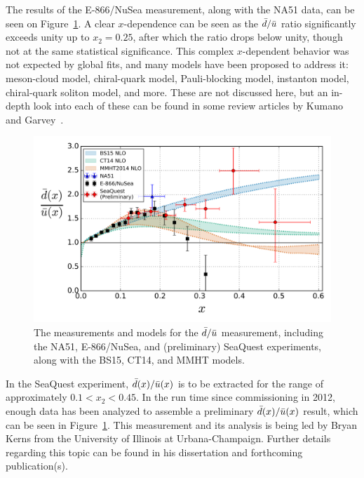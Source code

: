 The results of the E-866/NuSea measurement\cite{PhysRevLett.80.3715}, along with the NA51 data, can be seen on Figure~\ref{fig:dbar-ubar}. A clear $x$-dependence can be seen as the $\bar{d}/\bar{u}$ ratio significantly exceeds unity up to $x_2=0.25$, after which the ratio drops below unity, though not at the same statistical significance. This complex $x$-dependent behavior was not expected by global fits, and many models have been proposed to address it: meson-cloud model, chiral-quark model, Pauli-blocking model, instanton model, chiral-quark soliton model, and more. These are not discussed here, but an in-depth look into each of these can be found in some review articles by Kumano~\cite{Kumano:1997cy} and Garvey~\cite{Garvey:2001yq}.

\begin{figure}
	\centering
	\includegraphics[width=\textwidth]{figures/background/dbar_ubar.png}
	\caption{The measurements and models for the $\bar{d}/\bar{u}$ measurement, including the NA51\cite{Baldit:1994jk}, E-866/NuSea\cite{PhysRevLett.80.3715}, and (preliminary) SeaQuest experiments, along with the BS15, CT14, and MMHT models.}
	\label{fig:dbar-ubar}
\end{figure}

In the SeaQuest experiment, $\bar{d}(x)/\bar{u}(x)$ is to be extracted for the range of approximately $0.1<x_2<0.45$. In the run time since commissioning in 2012, enough data has been analyzed to assemble a preliminary $\bar{d}(x)/\bar{u}(x)$ result, which can be seen in Figure~\ref{fig:dbar-ubar}. This measurement and its analysis is being led by Bryan Kerns from the University of Illinois at Urbana-Champaign. Further details regarding this topic can be found in his dissertation and forthcoming publication(s).

